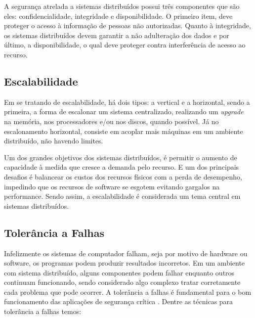 \documentclass[
	12pt,				%
	oneside,			%
	a4paper,			%
	english,			%
	brazil				%
	]{abntex2ppgsi}
\begin{document}
A segurança atrelada a sistemas distribuídos possui três componentes que são eles: confidencialidade, integridade e disponibilidade. O primeiro item, deve proteger o acesso à informação de pessoas não autorizadas. Quanto à integridade, os sistemas distribuídos devem garantir a não adulteração dos dados e por último, a disponibilidade, o qual deve proteger contra interferência de acesso ao recurso.

\subsection{Escalabilidade}

Em se tratando de escalabilidade, há dois tipos: a vertical e a horizontal, sendo a primeira, a forma de escalonar um sistema centralizado, realizando um \textit{upgrade} na memória, nos processadores e/ou nos discos, quando possível. Já no escalonamento horizontal, consiste em acoplar mais máquinas em um ambiente distribuído, não havendo limites.

Um dos grandes objetivos dos sistemas distribuídos, é permitir o aumento de capacidade à medida que cresce a demanda pelo recurso. E um dos principais desafios é balancear os custos dos recursos físicos com a perda de desempenho, impedindo que os recursos de software se esgotem evitando gargalos na performance. Sendo assim, a escalabilidade é considerada um tema central em sistemas distribuídos.

\subsection{Tolerância a Falhas}

Infelizmente os sistemas de computador falham, seja por motivo de hardware ou software, os programas podem produzir resultados incorretos. Em um ambiente com sistema distribuído, alguns componentes podem falhar enquanto outros continuam funcionando, sendo considerado algo complexo tratar corretamente cada problema que pode ocorrer. A tolerância a falhas é fundamental para o bom funcionamento das aplicações de segurança crítica \cite{gorender2002modelo} . Dentre as técnicas para tolerância a falhas temos: 
\end{document}

